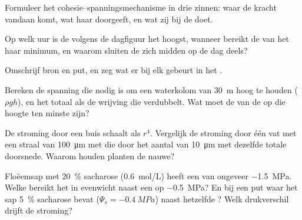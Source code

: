 \begin{exercise}[$\star$]\label{exo:b1:plant-transport:2}
Formuleer het cohesie--spanningsmechanisme in drie zinnen: waar de kracht
vandaan komt, wat haar doorgeeft, en wat zij bij de  doet.
\end{exercise}

\begin{exercise}[$\star$]\label{exo:b1:plant-transport:3}
Op welk uur is de  volgens de dagfiguur het hoogst, wanneer
bereikt de  van het  haar minimum, en waarom sluiten de
 zich midden op de dag deels?
\end{exercise}

\begin{exercise}[$\star$]\label{exo:b1:plant-transport:4}
Omschrijf bron en put, en zeg wat er bij elk gebeurt in het
.
\end{exercise}

\begin{exercise}[$\star\star$]\label{exo:b1:plant-transport:5}
Bereken de spanning die nodig is om een waterkolom van \qty{30}{m} hoog te
houden ($\rho g h$), en het totaal als de wrijving die verdubbelt. Wat moet
de  van de  op die hoogte ten minste zijn?
\end{exercise}

\begin{exercise}[$\star\star$]\label{exo:b1:plant-transport:6}
De stroming door een buis schaalt als $r^4$. Vergelijk de stroming door één
vat met een straal van \qty{100}{\micro m} met die door het aantal
 van \qty{10}{\micro m} met dezelfde totale doorsnede. Waarom
houden planten de nauwe?
\end{exercise}

\begin{exercise}[$\star\star$]\label{exo:b1:plant-transport:7}
Floëemsap met \qty{20}{\%} sacharose (\qty{0.6}{mol/L}) heeft een
 van ongeveer \qty{-1.5}{MPa}. Welke  bereikt het
 in evenwicht naast een  op \qty{-0.5}{MPa}? En bij een put
waar het sap \qty{5}{\%} sacharose bevat ($\Psi_s = \qty{-0.4}{MPa}$) naast
hetzelfde ? Welk drukverschil drijft de stroming?
\end{exercise}

